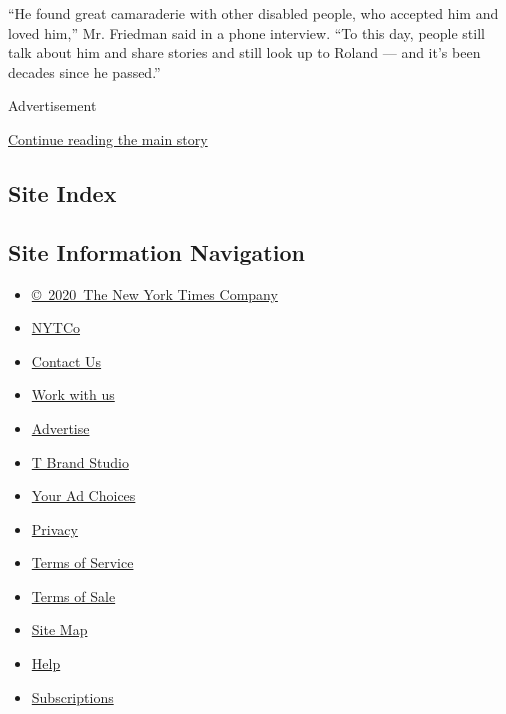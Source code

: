 ``He found great camaraderie with other disabled people, who accepted
him and loved him,'' Mr. Friedman said in a phone interview. ``To this
day, people still talk about him and share stories and still look up to
Roland --- and it's been decades since he passed.''

Advertisement

\protect\hyperlink{after-bottom}{Continue reading the main story}

\hypertarget{site-index}{%
\subsection{Site Index}\label{site-index}}

\hypertarget{site-information-navigation}{%
\subsection{Site Information
Navigation}\label{site-information-navigation}}

\begin{itemize}
\tightlist
\item
  \href{https://help.nytimes.com/hc/en-us/articles/115014792127-Copyright-notice}{©~2020~The
  New York Times Company}
\end{itemize}

\begin{itemize}
\tightlist
\item
  \href{https://www.nytco.com/}{NYTCo}
\item
  \href{https://help.nytimes.com/hc/en-us/articles/115015385887-Contact-Us}{Contact
  Us}
\item
  \href{https://www.nytco.com/careers/}{Work with us}
\item
  \href{https://nytmediakit.com/}{Advertise}
\item
  \href{http://www.tbrandstudio.com/}{T Brand Studio}
\item
  \href{https://www.nytimes.com/privacy/cookie-policy\#how-do-i-manage-trackers}{Your
  Ad Choices}
\item
  \href{https://www.nytimes.com/privacy}{Privacy}
\item
  \href{https://help.nytimes.com/hc/en-us/articles/115014893428-Terms-of-service}{Terms
  of Service}
\item
  \href{https://help.nytimes.com/hc/en-us/articles/115014893968-Terms-of-sale}{Terms
  of Sale}
\item
  \href{https://spiderbites.nytimes.com}{Site Map}
\item
  \href{https://help.nytimes.com/hc/en-us}{Help}
\item
  \href{https://www.nytimes.com/subscription?campaignId=37WXW}{Subscriptions}
\end{itemize}

